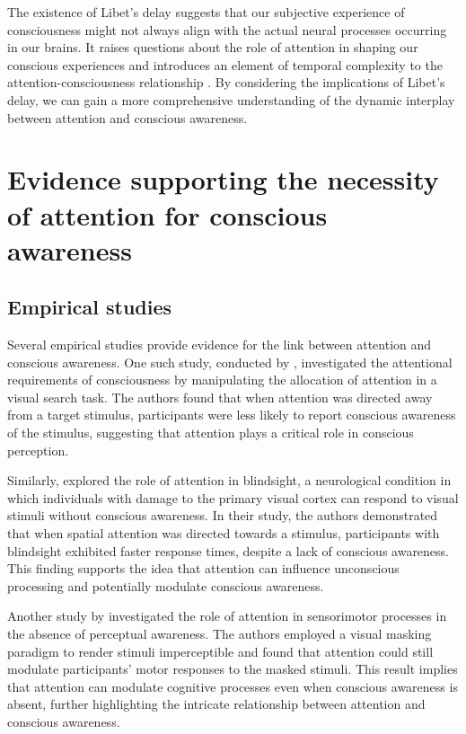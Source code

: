 \documentclass[10pt]{article}
\begin{document}
\begin{sloppypar}
  The existence of Libet’s delay suggests that our subjective experience of consciousness might not always align with the actual neural processes occurring in our brains. It raises questions about the role of attention in shaping our conscious experiences and introduces an element of temporal complexity to the attention-consciousness relationship \citep{noah_recent_2020}. By considering the implications of Libet’s delay, we can gain a more comprehensive understanding of the dynamic interplay between attention and conscious awareness.

  \section{Evidence supporting the necessity of attention for conscious awareness}
  \label{sec:evidence}

  \subsection{Empirical studies}
  \label{sec:empirical}

  Several empirical studies provide evidence for the link between attention and conscious awareness. One such study, conducted by \cite{cohen_attentional_2012}, investigated the attentional requirements of consciousness by manipulating the allocation of attention in a visual search task. The authors found that when attention was directed away from a target stimulus, participants were less likely to report conscious awareness of the stimulus, suggesting that attention plays a critical role in conscious perception.

  Similarly, \cite{kentridge_spatial_2004} explored the role of attention in blindsight, a neurological condition in which individuals with damage to the primary visual cortex can respond to visual stimuli without conscious awareness. In their study, the authors demonstrated that when spatial attention was directed towards a stimulus, participants with blindsight exhibited faster response times, despite a lack of conscious awareness. This finding supports the idea that attention can influence unconscious processing and potentially modulate conscious awareness.

  Another study by \cite{sumner_attentional_2006} investigated the role of attention in sensorimotor processes in the absence of perceptual awareness. The authors employed a visual masking paradigm to render stimuli imperceptible and found that attention could still modulate participants' motor responses to the masked stimuli. This result implies that attention can modulate cognitive processes even when conscious awareness is absent, further highlighting the intricate relationship between attention and conscious awareness.


\end{sloppypar}
\end{document}
